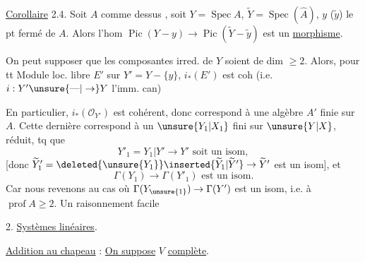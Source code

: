 \uline{Corollaire} 2.4. Soit $A$ comme dessus , soit $Y=\operatorname{Spec}A$, $\widetilde Y=\operatorname{Spec}(\widehat A)$, $y$ ($\widetilde y$) le pt fermé de $A$.  Alors l'hom $\operatorname{Pic}(Y-y)\to\operatorname{Pic}(\widetilde Y-\widetilde y)$ est un \uline{morphisme}.


On peut supposer que les composantes irred. de $Y$ soient de dim $\geq2$. Alors, pour tt Module loc. libre $E'$ sur $Y'=Y-\{y\}$, $i_*(E')$ est coh (i.e. $i:Y'\unsure{\text{---}|\to}Y$ l'imm. can)


En particulier, $i_*(\mathcal O_{Y'})$ est cohérent, donc correspond à une algèbre $A'$ finie sur $A$.  Cette dernière correspond à un $\unsure{Y_1|X_1}$ fini sur $\unsure{Y|X}$, réduit, tq que
\[
Y'_1=Y_1|Y'\to Y'\text{ soit un isom},
\]
[donc $\widetilde Y'_1=\deleted{\unsure{Y_1}}\inserted{\widetilde Y_1|\widetilde Y'}\to\widetilde Y'$ est  un isom],  et
\[
\Gamma(Y_1)\to\Gamma(Y'_1)\text{ est un isom}.
\]
Car nous revenons au cas où $\Gamma(Y_{\unsure{1}})\to\Gamma(Y')$ est un isom, i.e. à $\operatorname{prof}A\geq2$. Un raisonnement facile


2. \uline{Systèmes linéaires}.

\uline{Addition au chapeau} : \uline{On suppose} $V$ \uline{complète}.

